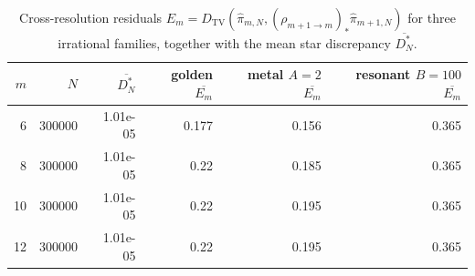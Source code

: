 \begin{table}[t]
\centering
\scriptsize
\setlength{\tabcolsep}{4pt}
\caption{Cross-resolution residuals
\(E_m=D_{\mathrm{TV}}(\hat\pi_{m,N},(\rho_{m+1\to m})_*\hat\pi_{m+1,N})\) for
three irrational families, together with the mean star discrepancy
\(\overline{D_N^*}\).}
\label{tab:rotation_multiscale_residual_summary}
\begin{tabular}{rrrrrr}
\toprule
$m$ & $N$ & $\overline{D_N^*}$ & golden $\overline{E_m}$ & metal $A=2$ $\overline{E_m}$ & resonant $B=100$ $\overline{E_m}$\\
\midrule
6 & 300000 & 1.01e-05 & 0.177 & 0.156 & 0.365\\
8 & 300000 & 1.01e-05 & 0.22 & 0.185 & 0.365\\
10 & 300000 & 1.01e-05 & 0.22 & 0.195 & 0.365\\
12 & 300000 & 1.01e-05 & 0.22 & 0.195 & 0.365\\
\bottomrule
\end{tabular}
\end{table}

